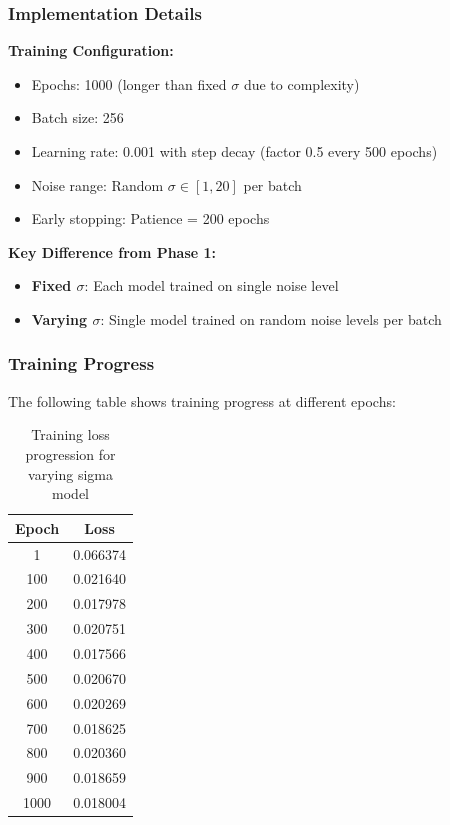 \documentclass[12pt,a4paper]{article}
\begin{document}
\subsubsection{Implementation Details}

\textbf{Training Configuration:}
\begin{itemize}
    \item Epochs: 1000 (longer than fixed $\sigma$ due to complexity)
    \item Batch size: 256
    \item Learning rate: 0.001 with step decay (factor 0.5 every 500 epochs)
    \item Noise range: Random $\sigma \in [1, 20]$ per batch
    \item Early stopping: Patience = 200 epochs
\end{itemize}

\textbf{Key Difference from Phase 1:}
\begin{itemize}
    \item \textbf{Fixed $\sigma$}: Each model trained on single noise level
    \item \textbf{Varying $\sigma$}: Single model trained on random noise levels per batch
\end{itemize}

\subsubsection{Training Progress}

The following table shows training progress at different epochs:

\begin{table}[H]
\centering
\begin{tabular}{cc}
\toprule
Epoch & Loss \\
\midrule
1 & 0.066374 \\
100 & 0.021640 \\
200 & 0.017978 \\
300 & 0.020751 \\
400 & 0.017566 \\
500 & 0.020670 \\
600 & 0.020269 \\
700 & 0.018625 \\
800 & 0.020360 \\
900 & 0.018659 \\
1000 & 0.018004 \\
\bottomrule
\end{tabular}
\caption{Training loss progression for varying sigma model}
\label{tab:varying_sigma_progress}
\end{table}
\end{document}
